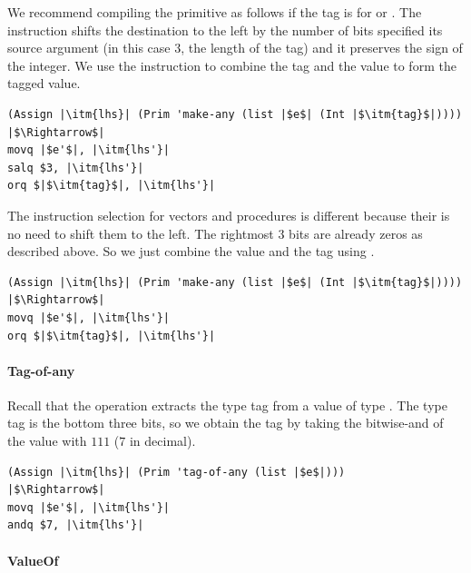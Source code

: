 \documentclass[11pt]{book}
\begin{document}
We recommend compiling the  primitive as follows if the
tag is for  or .  The  instruction
shifts the destination to the left by the number of bits specified its
source argument (in this case $3$, the length of the tag) and it
preserves the sign of the integer. We use the  instruction to
combine the tag and the value to form the tagged value.  \\
\begin{lstlisting}
(Assign |\itm{lhs}| (Prim 'make-any (list |$e$| (Int |$\itm{tag}$|))))
|$\Rightarrow$|
movq |$e'$|, |\itm{lhs'}|
salq $3, |\itm{lhs'}|
orq $|$\itm{tag}$|, |\itm{lhs'}|
\end{lstlisting}
The instruction selection for vectors and procedures is different
because their is no need to shift them to the left. The rightmost 3
bits are already zeros as described above. So we just combine the
value and the tag using .  \\
\begin{lstlisting}
(Assign |\itm{lhs}| (Prim 'make-any (list |$e$| (Int |$\itm{tag}$|))))
|$\Rightarrow$|
movq |$e'$|, |\itm{lhs'}|
orq $|$\itm{tag}$|, |\itm{lhs'}|
\end{lstlisting}

\paragraph{Tag-of-any}

Recall that the  operation extracts the type tag from
a value of type . The type tag is the bottom three bits, so
we obtain the tag by taking the bitwise-and of the value with $111$
($7$ in decimal).
\begin{lstlisting}
(Assign |\itm{lhs}| (Prim 'tag-of-any (list |$e$|)))
|$\Rightarrow$|
movq |$e'$|, |\itm{lhs'}|
andq $7, |\itm{lhs'}|
\end{lstlisting}

\paragraph{ValueOf}
\end{document}
